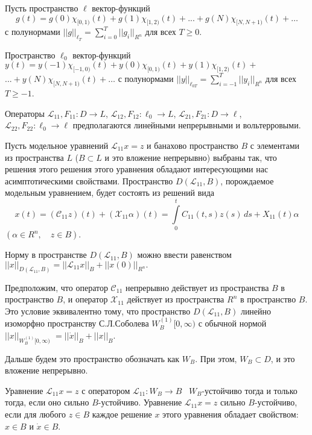 Пусть пространство $\ell $  вектор-функций $$g(t)=g(0)\chi _{[0,1)} (t)+g(1)\chi _{[1,2)} (t)+...+g(N)\chi _{[N,N+1)} (t)+\ldots $$
 с полунормами $||g||_{\ell _{T} } =\sum\limits_{i=0}^{T}||g_{i} ||_{R^n}  $ для всех $T\geq 0$.

Пространство $\ell _{0} $ вектор-функций $y(t)=y(-1)\chi _{[-1,0)} (t)+y(0)\chi _{[0,1)} (t)+y(1)\chi _{[1,2)} (t)+$ $...+y(N)\chi _{[N,N+1)} (t)+\ldots $ с полунормами $||y||_{\ell _{0T} } =\sum\limits_{i=-1}^{T}||y_{i} ||_{R^n}  $ для всех $T\ge -1$.

Операторы ${\mathcal L}_{11} ,F_{11} :D\to L$, ${\mathcal L}_{12} ,F_{12} :\ell _{0} \to L$, ${\mathcal L}_{21} ,F_{21} :D\to \ell $, $
{\mathcal L}_{22} ,F_{22} :\ell _{0} \to \ell $ предполагаются линейными непрерывными и вольтерровыми.

Пусть модельное уравнений ${\mathcal L}_{11} x=z$ и банахово пространство $B$ с элементами из пространства $L$ ($B\subset L$ и это вложение непрерывно) выбраны так, что решения этого решения этого уравнения обладают интересующими нас асимптотическими свойствами. Пространство $D({\mathcal L}_{11} ,B)$, порождаемое модельным уравнением, будет состоять из решений вида
$$
x(t)=\left({\mathcal C}_{11} z\right)(t)+({\mathcal X}_{11} \alpha )(t)= \int\limits_0^t C_{11}(t,s)z(s)\,ds + X_{11}(t)\alpha
$$
$
(\alpha \in R^n, \quad z\in B).
$

Норму в пространстве $D({\mathcal L}_{11} ,B)$ можно ввести равенством
$||x||_{D({\mathcal L}_{11} ,B)}  = ||{\mathcal L}_{11} x||_{B} +||x(0)||_{R^n}.$

Предположим, что оператор ${\mathcal C}_{11} $ непрерывно действует из пространства $B$ в пространство $B$, и оператор ${\mathcal X}_{11} $ действует из пространства $R^n$ в пространство $B$. Это условие эквивалентно тому, что пространство $D({\mathcal L}_{11} ,B)$ линейно изоморфно пространству С.Л.Соболева $W_{B}^{(1)} [0,\infty )$ с обычной нормой
$||x||_{W_{B}^{(1)} [0,\infty )}$ $=||\dot{x}||_{B} +||x||_{B}.$

Дальше будем это пространство обозначать как $W_{B} $. При этом, $W_{B} \subset D$, и это вложение непрерывно.

Уравнение ${\mathcal L}_{11} x=z$ с оператором ${\mathcal L}_{11} :W_{B} \to B$ \, $W_{B} $-ус\-т\-о\-й\-чи\-во тогда и только тогда, если оно сильно $B$-ус\-т\-о\-й\-чи\-во. Уравнение ${\mathcal L}_{11} x=z$ сильно $B$-ус\-т\-о\-й\-чи\-во, если для любого $z\in B$ каждое решение $x$ этого уравнения обладает свойством: $x\in B$ и $\dot{x}\in B$.

